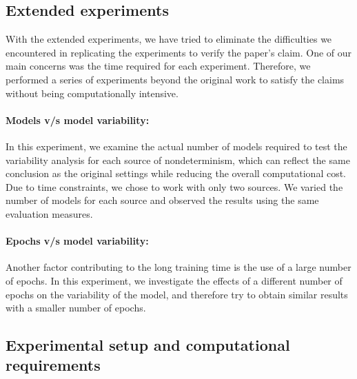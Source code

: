 \subsection{Extended experiments}
With the extended experiments, we have tried to eliminate the difficulties we encountered in replicating the experiments to verify the paper's claim. One of our main concerns was the time required for each experiment. Therefore, we performed a series of experiments beyond the original work to satisfy the claims without being computationally intensive.
\paragraph{Models v/s model variability:}
In this experiment, we examine the actual number of models required to test the variability analysis for each source of nondeterminism, which can reflect the same conclusion as the original settings while reducing the overall computational cost. Due to time constraints, we chose to work with only two sources. We varied the number of models for each source and observed the results using the same evaluation measures. 
\paragraph{Epochs v/s model variability:}
Another factor contributing to the long training time is the use of a large number of epochs. In this experiment, we investigate the effects of a different number of epochs on the variability of the model, and therefore try to obtain similar results with a smaller number of epochs.
 


\subsection{Experimental setup and computational requirements}
 
